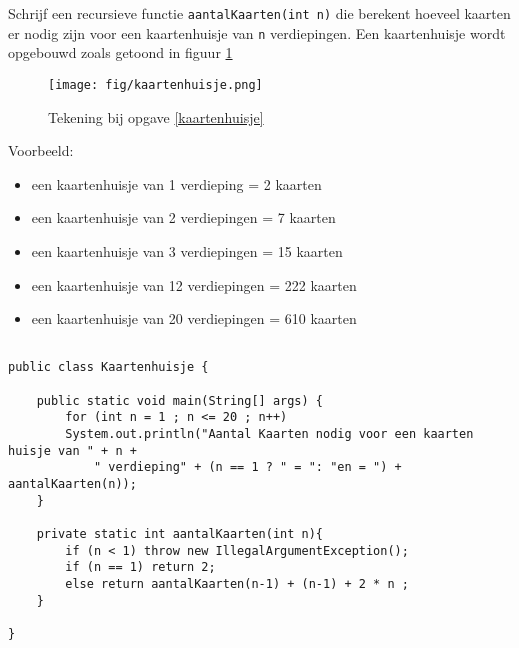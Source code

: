 \begin{oef}\label{kaartenhuisje}
\code Schrijf een recursieve functie \verb/aantalKaarten(int n)/ die berekent hoeveel kaarten er nodig zijn voor een kaartenhuisje van \verb/n/ verdiepingen. Een kaartenhuisje wordt opgebouwd zoals getoond in figuur \ref{fig:kaartenhuisje}
\begin{figure}[H]
\centering
\texttt{[image: fig/kaartenhuisje.png]}
\caption{Tekening bij opgave \ref{kaartenhuisje}}
\label{fig:kaartenhuisje}
\end{figure}
Voorbeeld: 
\begin{itemize}
\item een kaartenhuisje van 1 verdieping = 2 kaarten
\item een kaartenhuisje van 2 verdiepingen = 7  kaarten
\item een kaartenhuisje van 3 verdiepingen = 15 kaarten
\item een kaartenhuisje van 12 verdiepingen = 222 kaarten
\item een kaartenhuisje van 20 verdiepingen = 610 kaarten
\end{itemize}

\begin{opl}
\begin{lstlisting}[caption={Aantal kaarten nodig om een kaartenhuisje te maken}, label=reckaartenHuisje]

public class Kaartenhuisje {

	public static void main(String[] args) {
		for (int n = 1 ; n <= 20 ; n++)
		System.out.println("Aantal Kaarten nodig voor een kaarten huisje van " + n + 
			" verdieping" + (n == 1 ? " = ": "en = ") + aantalKaarten(n));
	}
	
	private static int aantalKaarten(int n){
		if (n < 1) throw new IllegalArgumentException();
		if (n == 1) return 2;
		else return aantalKaarten(n-1) + (n-1) + 2 * n ;
	}

}
\end{lstlisting}

\end{opl}

\end{oef}


\vspace*{\fill}
